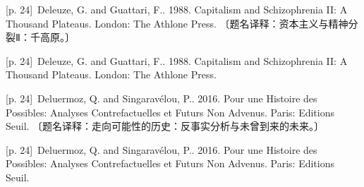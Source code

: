 \documentclass[10pt,a4paper]{article}
\begin{document}
\noindent\begin{minipage}{\textwidth}\begin{minipage}[t]{\dimexpr.5\textwidth-4mm\relax}\noindent\begin{minipage}[t]{\linewidth}{\scriptsize\color{gray} [p. 24]}\ Deleuze, G. and Guattari, F.. 1988. Capitalism and Schizophrenia II: A Thousand Plateaus. London: The Athlone Press. 〔题名译释：资本主义与精神分裂Ⅱ：千高原。〕\par\end{minipage}\par\end{minipage}\hfill\begin{minipage}[t]{\dimexpr.5\textwidth-4mm\relax}\noindent\begin{minipage}[t]{\linewidth}{\scriptsize\color{gray} [p. 24]}\ Deleuze, G. and Guattari, F.. 1988. Capitalism and Schizophrenia II: A Thousand Plateaus. London: The Athlone Press.\par\end{minipage}\par\end{minipage}\end{minipage}\par
\noindent\begin{minipage}{\textwidth}\begin{minipage}[t]{\dimexpr.5\textwidth-4mm\relax}\noindent\begin{minipage}[t]{\linewidth}{\scriptsize\color{gray} [p. 24]}\ Deluermoz, Q. and Singaravélou, P.. 2016. Pour une Histoire des Possibles: Analyses Contrefactuelles et Futurs Non Advenus. Paris: Editions Seuil. 〔题名译释：走向可能性的历史：反事实分析与未曾到来的未来。〕\par\end{minipage}\par\end{minipage}\hfill\begin{minipage}[t]{\dimexpr.5\textwidth-4mm\relax}\noindent\begin{minipage}[t]{\linewidth}{\scriptsize\color{gray} [p. 24]}\ Deluermoz, Q. and Singaravélou, P.. 2016. Pour une Histoire des Possibles: Analyses Contrefactuelles et Futurs Non Advenus. Paris: Editions Seuil.\par\end{minipage}\par\end{minipage}\end{minipage}\par
\end{document}
